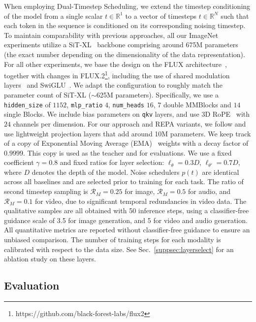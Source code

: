 \documentclass{article}
\theoremstyle{plain}
\theoremstyle{definition}
\theoremstyle{remark}
\begin{document}
When employing Dual-Timestep Scheduling, we extend the timestep conditioning of the model from a single scalar $t\in \mathbb{R}^1$ to a vector of timesteps $t\in \mathbb{R}^N$ such that each token in the sequence is conditioned on its corresponding noising timestep.
To maintain comparability with previous approaches, all our ImageNet experiments utilize a SiT-XL~\cite{sit} backbone comprising around 675M parameters (the exact number depending on the dimensionality of the data representation). For all other experiments, we base the design on the FLUX architecture~\cite{labs2025flux}, together with changes in FLUX.2\footnote{
https://github.com/black-forest-labs/flux2}, including the use of shared modulation layers~\citep{chen2025ditairrevisitingefficiencydiffusion} and SwiGLU~\cite{shazeer2020glu}. We adapt the configuration to roughly match the parameter count of SiT-XL ($\sim$625M parameters). Specifically, we use a \texttt{hidden\_size} of $1152$, \texttt{mlp\_ratio} $4$, \texttt{num\_heads} $16$, $7$ double MMBlocks and $14$ single Blocks. We include bias parameters on \texttt{qkv} layers, and use 3D RoPE~\cite{su2024roformer} with $24$ channels per dimension. For our approach and REPA variants, we follow \cite{repa} and use lightweight projection layers that add around 10M parameters. We keep track of a copy of Exponential Moving Average (EMA)~\cite{moralesbrotons2024exponentialmovingaverageweights} weights with a decay factor of $0.9999$. This copy is used as the teacher and for evaluations. We use a fixed coefficient $\gamma = 0.8$ and fixed ratios for layer selection: $\ell_{\theta} = 0.3D$, $\ell_{\theta'} = 0.7D$, where $D$ denotes the depth of the model. Noise schedulers $p(t)$ are identical across all baselines and are selected prior to training for each task. The ratio of second timestep sampling is $\mathcal{R}_{M}=0.25$ for image, $\mathcal{R}_{M}=0.5$ for audio, and $\mathcal{R}_{M}=0.1$ for video, due to significant temporal redundancies in video data. The qualitative samples are all obtained with 50 inference steps, using a classifier-free guidance scale of 3.5 for image generation, and 5 for video and audio generation. All quantitative metrics are reported without classifier-free guidance to ensure an unbiased comparison. The number of training steps for each modality is calibrated with respect to the data size.
See Sec.~\ref{suppsec:layerselect} for an ablation study on these layers.

\subsection{Evaluation}
\end{document}
